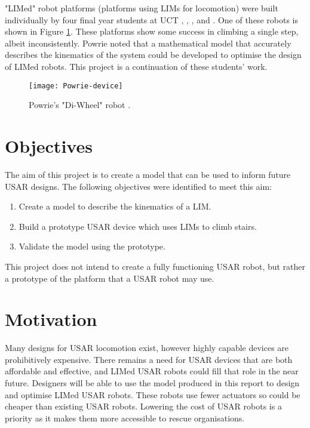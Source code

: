 \noindent "LIMed" robot platforms (platforms using LIMs for locomotion) were built individually by four final year students at UCT \citep{Wilson-2013},  \citep{Haskel-2017}, \citep{Buchanan-2018}, and \citep{Powrie-2019}. One of these robots is shown in Figure \ref{Powrie robot}. These platforms show some success in climbing a single step, albeit inconsistently. Powrie noted that a mathematical model that accurately describes the kinematics of the system could be developed to optimise the design of LIMed robots. This project is a continuation of these students' work.


\begin{figure}[h]
	\centering
	\texttt{[image: Powrie-device]}
	\caption{Powrie's "Di-Wheel" robot \citep{Powrie-2019}.}
	\label{Powrie robot}
\end{figure}

\section{Objectives}
The aim of this project is to create a model that can be used to inform future USAR designs.
The following objectives were identified to meet this aim:
\begin{enumerate}
	\item Create a model to describe the kinematics of a LIM.
	\item Build a prototype USAR device which uses LIMs to climb stairs.
	\item Validate the model using the prototype.
\end{enumerate}
This project does not intend to create a fully functioning USAR robot, but rather a prototype of the platform that a USAR robot may use.
\section{Motivation}

Many designs for USAR locomotion exist, however highly capable devices are prohibitively expensive. There remains a need for USAR devices that are both affordable and effective, and LIMed USAR robots could fill that role in the near future. Designers will be able to use the model produced in this report to design and optimise LIMed USAR robots. These robots use fewer actuators so could be cheaper than existing USAR robots. Lowering the cost of USAR robots is a priority as it makes them more accessible to rescue organisations.